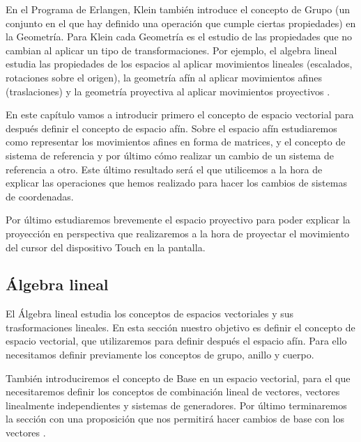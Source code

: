 \documentclass[a4paper,11pt, oneside]{book}
\begin{document}
En el Programa de Erlangen, Klein también introduce el concepto de Grupo (un conjunto en el que hay definido una operación que cumple ciertas propiedades) en la Geometría. Para Klein cada Geometría es el estudio de las propiedades que no cambian al aplicar un tipo de transformaciones. Por ejemplo, el algebra lineal estudia las propiedades de los espacios al aplicar movimientos lineales (escalados, rotaciones sobre el origen), la geometría afín al aplicar movimientos afines (traslaciones) y la geometría proyectiva al aplicar movimientos proyectivos \cite{bell}.

En este capítulo vamos a introducir primero el concepto de espacio vectorial para después definir el concepto de espacio afín. Sobre el espacio afín estudiaremos como representar los movimientos afines en forma de matrices, y el concepto de sistema de referencia y por último cómo realizar un cambio de un sistema de referencia a otro. Este último resultado será el que utilicemos a la hora de explicar las operaciones que hemos realizado para hacer los cambios de sistemas de coordenadas.

Por último estudiaremos brevemente el espacio proyectivo para poder explicar la proyección en perspectiva que realizaremos a la hora de proyectar el movimiento del cursor del dispositivo Touch en la pantalla.

 


\subsection{Álgebra lineal}

El Álgebra lineal estudia los conceptos de espacios vectoriales y sus trasformaciones lineales. En esta sección nuestro objetivo es definir el concepto de espacio vectorial, que utilizaremos para definir después el espacio afín. Para ello necesitamos definir previamente los conceptos de grupo, anillo y cuerpo. 

También introduciremos el concepto de Base en un espacio vectorial, para el que necesitaremos definir los conceptos de combinación lineal de vectores, vectores linealmente independientes y sistemas de generadores. Por último terminaremos la sección con una proposición que nos permitirá hacer cambios de base con los vectores \cite{algebra}.
\end{document}
